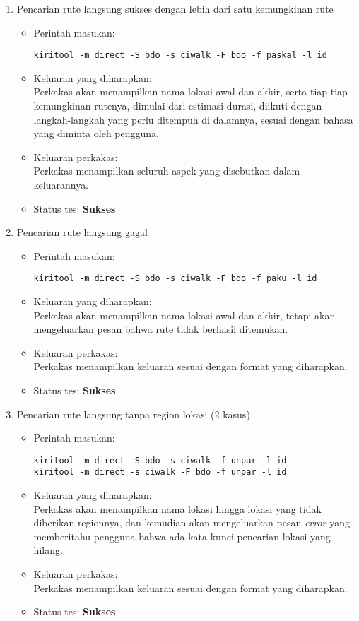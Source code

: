 \begin{enumerate}
	\item Pencarian rute langsung sukses dengan lebih dari satu kemungkinan rute
	\begin{itemize}
		\item Perintah masukan:
		\begin{verbatim}
kiritool -m direct -S bdo -s ciwalk -F bdo -f paskal -l id
		\end{verbatim}
		\item Keluaran yang diharapkan: \\
		Perkakas akan menampilkan nama lokasi awal dan akhir, serta tiap-tiap kemungkinan rutenya, dimulai dari estimasi durasi, diikuti dengan langkah-langkah yang perlu ditempuh di dalamnya, sesuai dengan bahasa yang diminta oleh pengguna.
		\item Keluaran perkakas: \\
		Perkakas menampilkan seluruh aspek yang disebutkan dalam keluarannya.
		\item Status tes: \textbf{Sukses}
	\end{itemize}
	
	\item Pencarian rute langsung gagal
	\begin{itemize}
		\item Perintah masukan:
		\begin{verbatim}
kiritool -m direct -S bdo -s ciwalk -F bdo -f paku -l id
		\end{verbatim}
		\item Keluaran yang diharapkan: \\
		Perkakas akan menampilkan nama lokasi awal dan akhir, tetapi akan mengeluarkan pesan bahwa rute tidak berhasil ditemukan.
		\item Keluaran perkakas: \\
		Perkakas menampilkan keluaran sesuai dengan format yang diharapkan.
		\item Status tes: \textbf{Sukses}
	\end{itemize}
	
	\item Pencarian rute langsung tanpa region lokasi (2 kasus)
	\begin{itemize}
		\item Perintah masukan:
		\begin{verbatim}
kiritool -m direct -S bdo -s ciwalk -f unpar -l id
kiritool -m direct -s ciwalk -F bdo -f unpar -l id
		\end{verbatim}
		\item Keluaran yang diharapkan: \\
		Perkakas akan menampilkan nama lokasi hingga lokasi yang tidak diberikan regionnya, dan kemudian akan mengeluarkan pesan \textit{error} yang memberitahu pengguna bahwa ada kata kunci pencarian lokasi yang hilang.
		\item Keluaran perkakas: \\
		Perkakas menampilkan keluaran sesuai dengan format yang diharapkan.
		\item Status tes: \textbf{Sukses}
	\end{itemize}
	

\end{enumerate}
